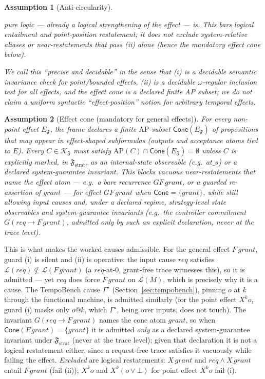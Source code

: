 \documentclass[11pt]{article}
\newtheorem{assumption}{Assumption}
\theoremstyle{remark}
\newcommand{\AP}{\mathrm{AP}}
\newcommand{\Lang}{\mathcal{L}}
\newcommand{\Frame}{\mathfrak{F}}
\begin{document}
\begin{assumption}[Anti-circularity]
\begin{enumerate}[label=(\roman*)]
        pure logic --- already a logical strengthening of the effect --- is. This
        bars logical entailment and point-position restatement; it does \emph{not}
        exclude system-relative aliases or near-restatements that pass (ii) alone
        (hence the mandatory effect cone below).
\end{enumerate}
We call this ``precise and decidable'' in the sense that (i) is a decidable
semantic invariance check for point/bounded effects, (ii) is a decidable
\(\omega\)-regular inclusion test for all effects, and the effect cone is a
declared finite AP subset; we do \emph{not} claim a uniform syntactic
``effect-position'' notion for arbitrary temporal effects.
\end{assumption}

\begin{assumption}[Effect cone (mandatory for general effects)]
\label{ass:cone}
For every non-point effect \(E_{\Frame}\), the frame declares a finite
\(\AP\)-subset \(\mathsf{Cone}(E_{\Frame})\) of propositions that may appear in
effect-shaped subformulas (outputs and acceptance atoms tied to \(E\)). Every
\(C\in\mathcal{K}_{\Frame}\) must satisfy \(\AP(C)\cap\mathsf{Cone}(E_{\Frame})
=\emptyset\) unless \(C\) is explicitly marked, in \(\Frame_{\mathrm{strat}}\), as
an internal-state observable (e.g.\ \(\mathit{at\_}s\)) or a declared
system-guarantee invariant. This blocks vacuous near-restatements that name the
effect atom --- e.g.\ a bare recurrence \(GF\,grant\), or a guarded re-assertion of
\(grant\) --- for effect \(GF\,grant\) when \(\mathsf{Cone}=\{grant\}\), while still
allowing input causes and, under a declared regime, strategy-level state
observables and system-guarantee invariants (e.g.\ the controller commitment
\(G(req\to F\,grant)\), admitted only by such an explicit declaration, never at the
trace level).
\end{assumption}

This is what makes the worked causes admissible. For the general effect
\(F\,grant\), guard (i) is silent and (ii) is operative: the input cause \(req\)
satisfies \(\Lang(req)\not\subseteq\Lang(F\,grant)\) (a \(req\)-at-0, grant-free
trace witnesses this), so it is admitted --- yet \(req\) does force \(F\,grant\) on
\(\Lang(M)\), which is precisely why it is a cause. The TempoBench cause
\(\Gamma^\star\) (Section~\ref{sec:tempobench}), pinning \(o\) at \(k\) through the
functional machine, is admitted similarly (for the point effect \(X^k o\), guard
(i) masks only \(o@k\), which \(\Gamma^\star\), being over inputs, does not touch).
The invariant \(G(req\rightarrow F\,grant)\) names the cone atom \(grant\), so when
\(\mathsf{Cone}(F\,grant)=\{grant\}\) it is admitted \emph{only} as a declared
system-guarantee invariant under \(\Frame_{\mathrm{strat}}\) (never at the trace
level); given that declaration it is not a logical restatement either, since a
request-free trace satisfies it vacuously while failing the effect. \emph{Excluded} are logical
restatements: \(X\,grant\) and \(req\land X\,grant\) entail \(F\,grant\) (fail
(ii)); \(X^k o\) and \(X^k(o\lor\bot)\) for point effect \(X^k o\) fail (i).
\end{document}
